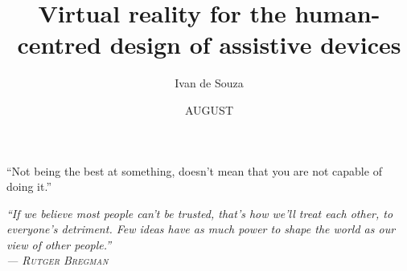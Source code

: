 \documentclass[msc, eng]{ita}    %
\author{Ivan de Souza}{Rehder}
\title{Virtual reality for the human-centred design of assistive devices}
\date{AUGUST}{04}{2022}
\begin{document}
\maketitle

\begin{itadedication}
    “Not being the best at something, doesn't mean that you are not capable of doing it.”\\
\end{itadedication}

\begin{itathanks}

\end{itathanks}

\thispagestyle{empty}
\ifhyperref{}\fi
\begin{flushright}
\begin{spacing}{1}
\mbox{}\vfill
{\sffamily\itshape
“If we believe most people can't be trusted, that's how we'll treat each other, to everyone's detriment. Few ideas have as much power to shape the world as our view of other people.”\\
    --- \textsc{Rutger Bregman}
}
\end{spacing}
\end{flushright}

% 

\begin{englishabstract}
\noindent

\end{englishabstract}

\listoffigures %

\listoftables %

\listofabbreviations
\end{document}
